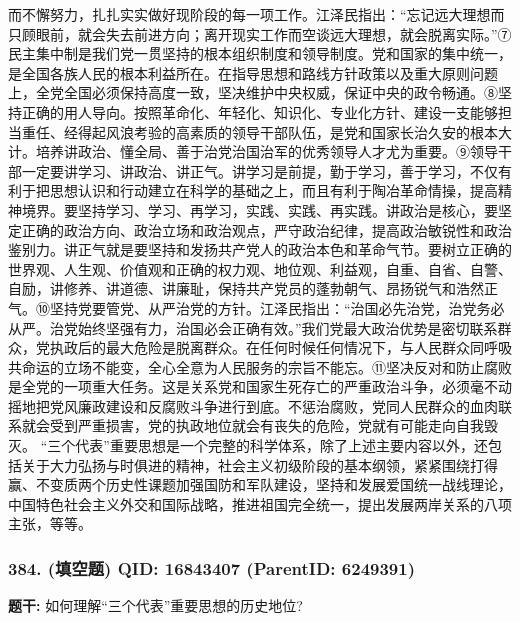 \documentclass[12pt,UTF8]{ctexart}
\begin{document}
而不懈努力，扎扎实实做好现阶段的每一项工作。江泽民指出：“忘记远大理想而只顾眼前，就会失去前进方向；离开现实工作而空谈远大理想，就会脱离实际。”⑦民主集中制是我们党一贯坚持的根本组织制度和领导制度。党和国家的集中统一，是全国各族人民的根本利益所在。在指导思想和路线方针政策以及重大原则问题上，全党全国必须保持高度一致，坚决维护中央权威，保证中央的政令畅通。⑧坚持正确的用人导向。按照革命化、年轻化、知识化、专业化方针、建设一支能够担当重任、经得起风浪考验的高素质的领导干部队伍，是党和国家长治久安的根本大计。培养讲政治、懂全局、善于治党治国治军的优秀领导人才尤为重要。⑨领导干部一定要讲学习、讲政治、讲正气。讲学习是前提，勤于学习，善于学习，不仅有利于把思想认识和行动建立在科学的基础之上，而且有利于陶冶革命情操，提高精神境界。要坚持学习、学习、再学习，实践、实践、再实践。讲政治是核心，要坚定正确的政治方向、政治立场和政治观点，严守政治纪律，提高政治敏锐性和政治鉴别力。讲正气就是要坚持和发扬共产党人的政治本色和革命气节。要树立正确的世界观、人生观、价值观和正确的权力观、地位观、利益观，自重、自省、自警、自励，讲修养、讲道德、讲廉耻，保持共产党员的蓬勃朝气、昂扬锐气和浩然正气。⑩坚持党要管党、从严治党的方针。江泽民指出：“治国必先治党，治党务必从严。治党始终坚强有力，治国必会正确有效。”我们党最大政治优势是密切联系群众，党执政后的最大危险是脱离群众。在任何时候任何情况下，与人民群众同呼吸共命运的立场不能变，全心全意为人民服务的宗旨不能忘。⑪坚决反对和防止腐败是全党的一项重大任务。这是关系党和国家生死存亡的严重政治斗争，必须毫不动摇地把党风廉政建设和反腐败斗争进行到底。不惩治腐败，党同人民群众的血肉联系就会受到严重损害，党的执政地位就会有丧失的危险，党就有可能走向自我毁灭。
“三个代表”重要思想是一个完整的科学体系，除了上述主要内容以外，还包括关于大力弘扬与时俱进的精神，社会主义初级阶段的基本纲领，紧紧围绕打得赢、不变质两个历史性课题加强国防和军队建设，坚持和发展爱国统一战线理论，中国特色社会主义外交和国际战略，推进祖国完全统一，提出发展两岸关系的八项主张，等等。

\vspace{0.3em}\hrulefill\vspace{0.7em}

\subsubsection*{384. (填空题) \small QID: 16843407 (ParentID: 6249391)}

\textbf{题干:}
如何理解“三个代表”重要思想的历史地位?
\end{document}
